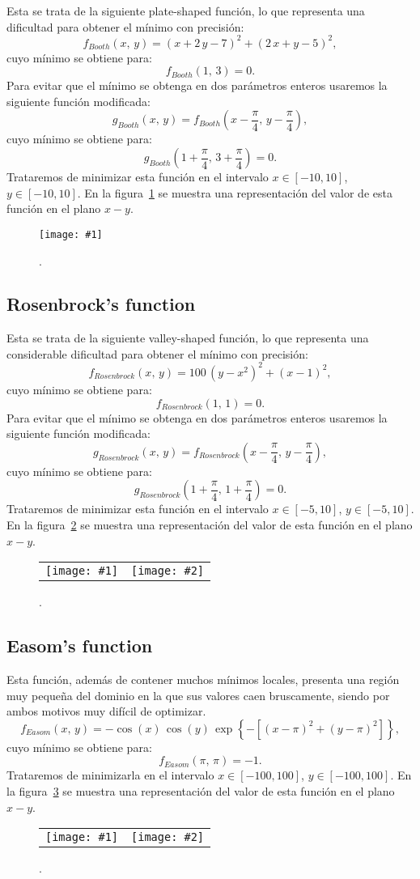 \documentclass[review,authoryear]{elsarticle}
\newcommand{\EQ}[2]
{\begin{equation}#1\label{#2}\end{equation}}
\newcommand{\PLOT}[3]
{
	\begin{figure}[ht!]
		\centering
		\texttt{[image: \#1]}
		\caption{#2.\label{#3}}
	\end{figure}
}
\newcommand{\PLOTII}[4]
{
	\begin{figure}[ht!]
		\centering
		\begin{tabular}{cc}
			\texttt{[image: \#1]} & \texttt{[image: \#2]}
		\end{tabular}
		\caption{#3.\label{#4}}
	\end{figure}
}
\newcommand{\C}[1]{\left[#1\right]}
\newcommand{\PA}[1]{\left(#1\right)}
\newcommand{\LL}[1]{\left\{#1\right\}}
\begin{document}
Esta se trata de la siguiente plate-shaped función, lo que representa una
dificultad para obtener el mínimo con precisión:
\EQ{f_{Booth}(x,\,y)=(x+2\,y-7)^2+(2\,x+y-5)^2,}{EqFBooth}
cuyo mínimo se obtiene para:
\EQ{f_{Booth}(1,\,3)=0.}{EqFBoothM}
Para evitar que el mínimo se obtenga en dos parámetros enteros usaremos la
siguiente función modificada:
\EQ{g_{Booth}(x,\,y)=f_{Booth}\PA{x-\frac{\pi}{4},\,y-\frac{\pi}{4}},}
{EqGBooth}
cuyo mínimo se obtiene para:
\EQ{g_{Booth}\PA{1+\frac{\pi}{4},\,3+\frac{\pi}{4}}=0.}{EqGBoothM}
Trataremos de minimizar esta función en el intervalo $x\in[-10,10]$,
$y\in[-10,10]$.
En la figura~\ref{FigBooth} se muestra una representación del valor de esta
función en el plano $x-y$.
\PLOT{Booth.eps}{}{FigBooth}

\subsection{Rosenbrock's function}

Esta se trata de la siguiente valley-shaped función, lo que representa una
considerable dificultad para obtener el mínimo con precisión:
\EQ{f_{Rosenbrock}(x,\,y)=100\,\PA{y-x^2}^2+(x-1)^2,}{EqFRosenbrock}
cuyo mínimo se obtiene para:
\EQ{f_{Rosenbrock}(1,\,1)=0.}{EqFRosenbrockM}
Para evitar que el mínimo se obtenga en dos parámetros enteros usaremos la
siguiente función modificada:
\EQ{g_{Rosenbrock}(x,\,y)=f_{Rosenbrock}\PA{x-\frac{\pi}{4},\,y-\frac{\pi}{4}},}
{EqGRosenbrock}
cuyo mínimo se obtiene para:
\EQ{g_{Rosenbrock}\PA{1+\frac{\pi}{4},\,1+\frac{\pi}{4}}=0.}{EqGRosenbrockM}
Trataremos de minimizar esta función en el intervalo $x\in[-5,10]$,
$y\in[-5,10]$.
En la figura~\ref{FigRosenbrock} se muestra una representación del valor de esta
función en el plano $x-y$.
\PLOTII{Rosenbrock.eps}{Rosenbrock2.eps}{}{FigRosenbrock}

\subsection{Easom's function}

Esta función, además de contener muchos mínimos locales, presenta una región muy
pequeña del dominio en la que sus valores caen bruscamente, siendo por ambos
motivos muy difícil de optimizar.
\EQ{f_{Easom}(x,\,y)=-\cos(x)\,\cos(y)\,\exp\LL{-\C{(x-\pi)^2+(y-\pi)^2}},}
{EqFEasom}
cuyo mínimo se obtiene para:
\EQ{f_{Easom}(\pi,\,\pi)=-1.}{EqFEasomM}
Trataremos de minimizarla en el intervalo $x\in[-100,100]$, $y\in[-100,100]$.
En la figura~\ref{FigEasom} se muestra una representación del valor de esta
función en el plano $x-y$.
\PLOTII{Easom.eps}{Easom2.eps}{}{FigEasom}
\end{document}
